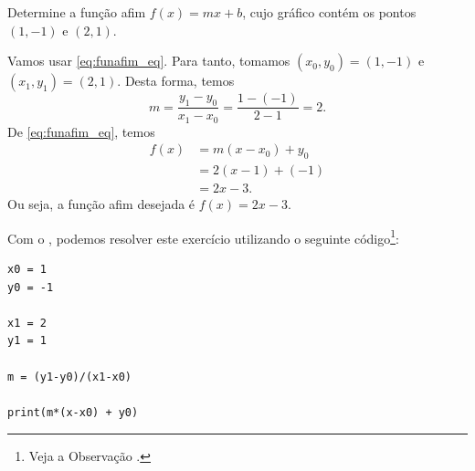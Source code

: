 \begin{exeresol}
  Determine a função afim $f(x) = mx + b$, cujo gráfico contém os pontos $(1, -1)$ e $(2, 1)$.
\end{exeresol}
\begin{resol}
  Vamos usar \eqref{eq:funafim_eq}. Para tanto, tomamos $(x_0, y_0) = (1, -1)$ e $(x_1, y_1) = (2, 1)$. Desta forma, temos
  \begin{equation}
    m = \frac{y_1 - y_0}{x_1 - x_0} = \frac{1 - (-1)}{2 - 1} = 2.
  \end{equation}
  De \eqref{eq:funafim_eq}, temos
  \begin{align}
    f(x) &= m(x-x_0) + y_0\\
         &= 2(x - 1) + (-1) \\
         &= 2x -3.
  \end{align}
  Ou seja, a função afim desejada é $f(x) = 2x - 3$.

  \ifispython
  Com o \sympy, podemos resolver este exercício utilizando o seguinte código\footnote{Veja a Observação \label{obs:cap_funafom_python}.}:
\begin{verbatim}
x0 = 1
y0 = -1

x1 = 2
y1 = 1

m = (y1-y0)/(x1-x0)

print(m*(x-x0) + y0)
\end{verbatim}
  \fi
\end{resol}

